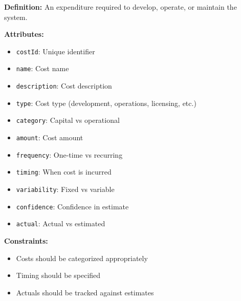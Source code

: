 \documentclass[11pt,letterpaper]{article}
\begin{document}
\begin{definitionbox}
\textbf{Definition:} An expenditure required to develop, operate, or maintain the system.

\textbf{Attributes:}
\begin{itemize}[nosep]
    \item \texttt{costId}: Unique identifier
    \item \texttt{name}: Cost name
    \item \texttt{description}: Cost description
    \item \texttt{type}: Cost type (development, operations, licensing, etc.)
    \item \texttt{category}: Capital vs operational
    \item \texttt{amount}: Cost amount
    \item \texttt{frequency}: One-time vs recurring
    \item \texttt{timing}: When cost is incurred
    \item \texttt{variability}: Fixed vs variable
    \item \texttt{confidence}: Confidence in estimate
    \item \texttt{actual}: Actual vs estimated
\end{itemize}

\textbf{Constraints:}
\begin{itemize}[nosep]
    \item Costs should be categorized appropriately
    \item Timing should be specified
    \item Actuals should be tracked against estimates
\end{itemize}
\end{definitionbox}
\end{document}
